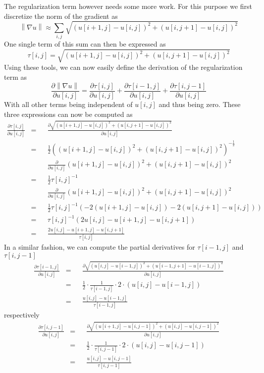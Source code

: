 \documentclass{paper}
\newcommand{\norm}[1]{\left\lVert#1\right\rVert}
\begin{document}
The regularization term however needs some more work. 
For this purpose we first discretize the norm of the gradient as
\begin{equation}
\norm{\nabla u} \approx \sum_{i,j} 
	\sqrt{(u[i+1,j] - u[i,j])^2 + (u[i, j+1] - u[i, j])^2}
\end{equation}
One single term of this sum can then be expressed as
\begin{equation}
\tau[i,j] = \sqrt{(u[i+1,j] - u[i,j])^2 + (u[i, j+1] - u[i, j])^2}
\end{equation}
Using these tools, we can now easily define the derivation of the regularization term as
\begin{equation}
\frac{\partial \norm{\nabla u}}{\partial u[i,j]} = 
	\frac{\partial \tau[i,j]}{\partial u[i,j]} +
	\frac{\partial \tau[i - 1,j]}{\partial u[i,j]} +
	\frac{\partial \tau[i,j - 1]}{\partial u[i,j]}
\end{equation}
With all other terms being independent of $u[i,j]$ and thus being zero.
These three expressions can now be computed as
\begin{align}
\frac{\partial \tau[i,j]}{\partial u[i,j]} 
&= &&\frac{\partial \sqrt{(u[i+1,j] - u[i,j])^2 + (u[i, j+1] - u[i, j])^2}}{\partial u[i,j]} \\
&= &&\frac{1}{2} ((u[i+1,j] - u[i,j])^2 + (u[i, j+1] - u[i, j])^2)^{-\frac{1}{2}} \\
& &&\frac{\partial}{\partial u[i,j]} 
(u[i+1,j] - u[i,j])^2 + (u[i, j+1] - u[i, j])^2 \\
&= &&\frac{1}{2}\tau[i,j]^{-1} \\
& &&\frac{\partial}{\partial u[i,j]} 
(u[i+1,j] - u[i,j])^2 + (u[i, j+1] - u[i, j])^2 \\
&= &&\frac{1}{2}\tau[i,j]^{-1}
(-2(u[i + 1, j] - u[i,j]) - 2(u[i, j+1] - u[i,j])) \\
&= &&\tau[i,j]^{-1} (2 u[i,j] -u[i + 1, j] - u[i, j+1]) \\
&= &&\frac{2u[i,j] - u[i + 1, j] - u[i, j+1]}{\tau[i,j]}
\end{align}
In a similar fashion, we can compute the partial derivatives for
$\tau[i-1, j]$ and $\tau[i, j - 1]$
\begin{align}
\frac{\partial \tau[i - 1,j]}{\partial u[i,j]} 
&= &&\frac{\partial \sqrt{(u[i,j] - u[i-1,j])^2 + (u[i-1, j+1] - u[i-1, j])^2}}{\partial u[i,j]} \\
&= &&\frac{1}{2} \cdot \frac{1}{\tau[i - 1, j]} \cdot 2 \cdot (u[i,j] - u[i-1, j]) \\
&= &&\frac{u[i,j] - u[i-1, j]}{\tau[i - 1, j]}
\end{align}
respectively
\begin{align}
\frac{\partial \tau[i,j-1]}{\partial u[i,j]} 
&= &&\frac{\partial \sqrt{(u[i + 1 ,j] - u[i,j - 1])^2 + (u[i, j] - u[i, j - 1])^2}}{\partial u[i,j]} \\
&= &&\frac{1}{2} \cdot \frac{1}{\tau[i, j - 1]} \cdot 2 \cdot (u[i,j] - u[i, j-1]) \\
&= &&\frac{u[i,j] - u[i, j - 1]}{\tau[i, j-1]}
\end{align}
\end{document}
